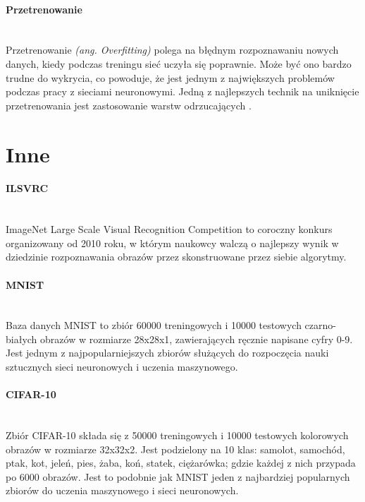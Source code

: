 \paragraph{Przetrenowanie} \mbox{}\\
Przetrenowanie \textit{(ang. Overfitting)} polega na błędnym rozpoznawaniu nowych danych,
kiedy podczas treningu sieć uczyła się poprawnie. Może być ono bardzo trudne do wykrycia,
co powoduje, że jest jednym z największych problemów podczas pracy z sieciami neuronowymi.
Jedną z najlepszych technik na uniknięcie przetrenowania jest zastosowanie warstw
odrzucających \cite{DropoutPreventOverfit}.

\section{Inne}

\paragraph{ILSVRC} \mbox{}\\
ImageNet Large Scale Visual Recognition Competition \cite{ILSVRC} to coroczny konkurs organizowany
od 2010 roku, w którym naukowcy walczą o najlepszy wynik w dziedzinie rozpoznawania
obrazów przez skonstruowane przez siebie algorytmy.

\paragraph{MNIST} \mbox{}\\
Baza danych MNIST \cite{MNIST} to zbiór 60000 treningowych i 10000 testowych czarno-białych obrazów
w rozmiarze 28x28x1, zawierających ręcznie napisane cyfry 0-9. Jest jednym z
najpopularniejszych zbiorów służących do rozpoczęcia nauki sztucznych sieci neuronowych
i uczenia maszynowego.

\paragraph{CIFAR-10} \mbox{}\\
Zbiór CIFAR-10 \cite{CIFAR-10} składa się z 50000 treningowych i 10000 testowych kolorowych obrazów w rozmiarze
32x32x2. Jest podzielony na 10 klas: samolot, samochód, ptak, kot, jeleń, pies, żaba,
koń, statek, ciężarówka; gdzie każdej z nich przypada po 6000 obrazów. Jest to podobnie
jak MNIST jeden z najbardziej popularnych zbiorów do uczenia maszynowego i sieci neuronowych.
